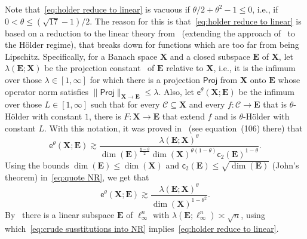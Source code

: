 \documentclass[11pt,reqno]{amsart}
\renewcommand{\le}{\leqslant}
\newcommand{\cc}{\mathsf{c}}
\newcommand{\proj}{\mathsf{Proj}}
\newcommand{\X}{\mathbf X}
\theoremstyle{remark}
\renewcommand{\subset}{\subseteq}
\newcommand{\ee}{\mathsf{e}}
\newcommand{\sub}{\mathscr{C}}
\renewcommand{\1}{\mathbf 1}
\newcommand{\bfE}{\mathbf{E}}
\begin{document}
Note that~\eqref{eq:holder reduce to linear} is vacuous if $\theta/2+\theta^2-1\le 0$, i.e., if $0<\theta\le (\sqrt{17}-1)/2$. The reason for this is that~\eqref{eq:holder reduce to linear} is based on a reduction to the linear theory from~\cite{NR17} (extending the approach of~\cite{JL84} to the H\"older regime), that breaks down for functions which are too far from being Lipschitz. Specifically, for a Banach space $\X$ and a closed subspace $\bfE$ of $\X$, let $\lambda(\bfE;\X)$ be the  projection constant~\cite{Gru60} of $\bfE$ relative to $\X$, i.e., it is the infimum over those $\lambda\in [1,\infty]$ for which there is a projection $\proj$ from $\X$ onto $\bfE$ whose operator norm satisfies $\|\proj\|_{\X\to \bfE}\le \lambda$. Also, let $\ee^\theta(\X;\bfE)$ be the infimum over those $L\in [1,\infty]$ such that for every $\sub\subset \X$ and every $f:\sub\to \bfE$ that is $\theta$-H\"older with constant $1$, there is $F:\X\to \bfE$ that extend $f$ and is $\theta$-H\"older with constant $L$. With this notation,  it was proved in~\cite{NR17} (see equation~(106) there) that
\begin{equation}\label{eq:quote NR}
\ee^\theta(\X;\bfE)\gtrsim \frac{\lambda(\bfE;\X)^\theta}{\dim(\bfE)^{\frac{\1-\theta}{2}}\dim(\X)^{\theta(1-\theta)}\cc_2(\bfE)^{1-\theta}}.
\end{equation}
Using the bounds $\dim(\bfE)\le \dim(\X)$ and  $\cc_2(\bfE)\le \sqrt{\dim(\bfE)}$ (John's theorem) in~\eqref{eq:quote NR}, we get that
\begin{equation}\label{eq:crude susstitutions into NR}
\ee^\theta(\X;\bfE)\gtrsim \frac{\lambda(\bfE;\X)^\theta}{\dim(\X)^{1-\theta^2}}.
\end{equation}
By~\cite{Sob41} there is a linear subspace $\bfE$ of $\ell_\infty^n$ with $\lambda(\bfE;\ell_\infty^n)\asymp \sqrt{n}$, using which~\eqref{eq:crude susstitutions into NR} implies~\eqref{eq:holder reduce to linear}.
\end{document}
